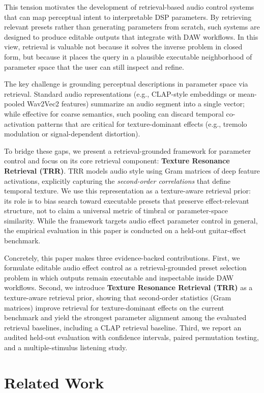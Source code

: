 This tension motivates the development of retrieval-based audio control systems that can map perceptual intent to interpretable DSP parameters. By retrieving relevant presets rather than generating parameters from scratch, such systems are designed to produce editable outputs that integrate with DAW workflows. In this view, retrieval is valuable not because it solves the inverse problem in closed form, but because it places the query in a plausible executable neighborhood of parameter space that the user can still inspect and refine.

The key challenge is grounding perceptual descriptions in parameter space via retrieval. Standard audio representations (e.g., CLAP-style embeddings or mean-pooled Wav2Vec2 features) summarize an audio segment into a single vector; while effective for coarse semantics, such pooling can discard temporal co-activation patterns that are critical for texture-dominant effects (e.g., tremolo modulation or signal-dependent distortion).

To bridge these gaps, we present a retrieval-grounded framework for parameter control and focus on its core retrieval component: \textbf{Texture Resonance Retrieval (TRR)}. TRR models audio style using Gram matrices of deep feature activations, explicitly capturing the \textit{second-order correlations} that define temporal texture. We use this representation as a texture-aware retrieval prior: its role is to bias search toward executable presets that preserve effect-relevant structure, not to claim a universal metric of timbral or parameter-space similarity. While the framework targets audio effect parameter control in general, the empirical evaluation in this paper is conducted on a held-out guitar-effect benchmark.

Concretely, this paper makes three evidence-backed contributions. First, we formulate editable audio effect control as a retrieval-grounded preset selection problem in which outputs remain executable and inspectable inside DAW workflows. Second, we introduce \textbf{Texture Resonance Retrieval (TRR)} as a texture-aware retrieval prior, showing that second-order statistics (Gram matrices) improve retrieval for texture-dominant effects on the current benchmark and yield the strongest parameter alignment among the evaluated retrieval baselines, including a CLAP retrieval baseline. Third, we report an audited held-out evaluation with confidence intervals, paired permutation testing, and a multiple-stimulus listening study.

\section{Related Work}
\label{sec:related_work}

